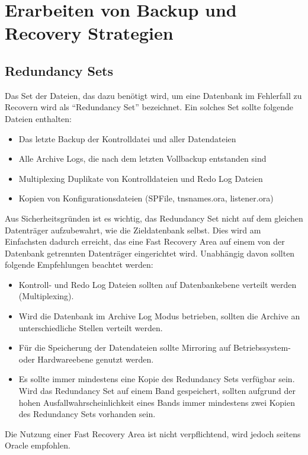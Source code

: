     \section{Erarbeiten von Backup und Recovery Strategien}
      \subsection{Redundancy Sets}
        Das Set der Dateien, das dazu benötigt wird, um eine Datenbank im Fehlerfall zu Recovern wird als \enquote{Redundancy Set} bezeichnet. Ein solches Set sollte folgende Dateien enthalten:
        \begin{itemize}
          \item Das letzte Backup der Kontrolldatei und aller Datendateien
          \item Alle Archive Logs, die nach dem letzten Vollbackup entstanden sind
          \item Multiplexing Duplikate von Kontrolldateien und Redo Log Dateien
          \item Kopien von Konfigurationsdateien (SPFile, tnsnames.ora, listener.ora)
        \end{itemize}
        Aus Sicherheitsgründen ist es wichtig, das Redundancy Set nicht auf dem gleichen Datenträger aufzubewahrt, wie die Zieldatenbank selbst. Dies wird am Einfachsten dadurch erreicht, das eine Fast Recovery Area auf einem von der Datenbank getrennten Datenträger eingerichtet wird. Unabhängig davon sollten folgende Empfehlungen beachtet werden:
        \begin{itemize}
          \item Kontroll- und Redo Log Dateien sollten auf Datenbankebene verteilt werden (Multiplexing).
          \item Wird die Datenbank im Archive Log Modus betrieben, sollten die Archive an unterschiedliche Stellen verteilt werden.
          \item Für die Speicherung der Datendateien sollte Mirroring auf Betriebssystem- oder Hardwareebene genutzt werden.
          \item Es sollte immer mindestens eine Kopie des Redundancy Sets verfügbar sein. Wird das Redundancy Set auf einem Band gespeichert, sollten aufgrund der hohen Ausfallwahrscheinlichkeit eines Bands immer mindestens zwei Kopien des Redundancy Sets vorhanden sein.
        \end{itemize}
        Die Nutzung einer Fast Recovery Area ist nicht  verpflichtend, wird
        jedoch seitens Oracle empfohlen.
